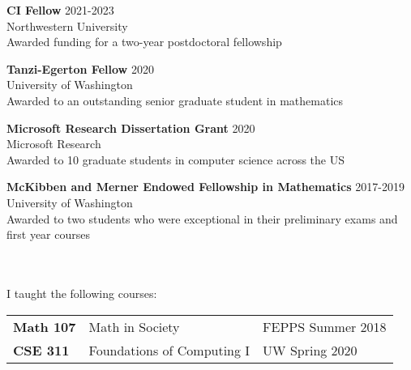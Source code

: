 \documentclass[12 pt]{article}
\newcommand{\lineunder}{\vspace*{-8pt} \\ \hspace*{-18pt} \hrulefill \\}
\newcommand{\header}[1]{{\hspace*{-15pt}\vspace*{6pt} \selectfont{\textsc{#1}}} \vspace*{-6pt} \lineunder}
\newcommand{\employer}[3]{{ \textbf{#1} \hfill #2 \\ #3\\  }}
\begin{document}
\employer{CI Fellow}{2021-2023}{Northwestern University}
\smallskip
Awarded funding for a two-year postdoctoral fellowship\\

\bigskip

\employer{Tanzi-Egerton Fellow}{2020}{University of Washington}
\smallskip
Awarded to an outstanding senior graduate student in mathematics\\

\bigskip



\clearpage

\employer{Microsoft Research Dissertation Grant}{2020}{Microsoft Research}
Awarded to 10 graduate students in computer science across the US 
\bigskip

\employer{McKibben and Merner Endowed Fellowship in Mathematics}{2017-2019}{University of Washington}
\smallskip
Awarded to two students who were exceptional in their preliminary exams 
and first year courses\\

\bigskip











\header{Teaching}

I taught the following courses:
\begin{center}
	\begin{tabular}{ l l l }
	  \textbf{Math 107}& Math in Society & FEPPS Summer 2018 \\ 
	  \textbf{CSE 311}&	 Foundations of Computing I & UW Spring 2020 	
	\end{tabular}
\end{center}
\end{document}
